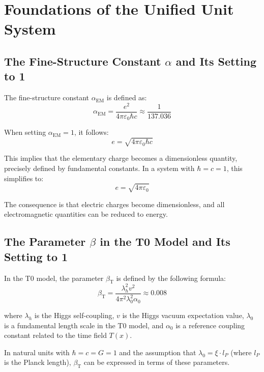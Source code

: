 ﻿\documentclass[12pt,a4paper]{article}
\newcommand{\Tfield}{T(x)}
\newcommand{\alphaEM}{\alpha_{\text{EM}}}
\newcommand{\betaT}{\beta_{\text{T}}}
\begin{document}
	\section{Foundations of the Unified Unit System}
	
	\subsection{The Fine-Structure Constant \(\alpha\) and Its Setting to 1}
	
	The fine-structure constant \(\alphaEM\) is defined as:
	\begin{equation}
		\alphaEM = \frac{e^2}{4\pi\varepsilon_0 \hbar c} \approx \frac{1}{137.036}
	\end{equation}
	
	When setting \(\alphaEM = 1\), it follows:
	\begin{equation}
		e = \sqrt{4\pi\varepsilon_0 \hbar c}
	\end{equation}
	
	This implies that the elementary charge becomes a dimensionless quantity, precisely defined by fundamental constants. In a system with \(\hbar = c = 1\), this simplifies to:
	\begin{equation}
		e = \sqrt{4\pi\varepsilon_0}
	\end{equation}
	
	The consequence is that electric charges become dimensionless, and all electromagnetic quantities can be reduced to energy.
	
	\subsection{The Parameter \(\beta\) in the T0 Model and Its Setting to 1}
	
	In the T0 model, the parameter \(\betaT\) is defined by the following formula:
	\begin{equation}
		\betaT = \frac{\lambda_h^2 v^2}{4\pi^2 \lambda_0^2 \alpha_0} \approx 0.008
	\end{equation}
	
	where \(\lambda_h\) is the Higgs self-coupling, \(v\) is the Higgs vacuum expectation value, \(\lambda_0\) is a fundamental length scale in the T0 model, and \(\alpha_0\) is a reference coupling constant related to the time field \(\Tfield\).
	
	In natural units with \(\hbar = c = G = 1\) and the assumption that \(\lambda_0 = \xi \cdot l_P\) (where \(l_P\) is the Planck length), \(\betaT\) can be expressed in terms of these parameters.
	
\end{document}
